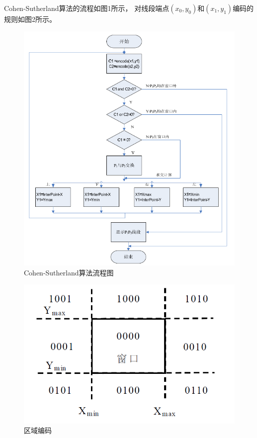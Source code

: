 \documentclass[a4paper,UTF8]{article}
\begin{document}
Cohen-Sutherland算法的流程如图1所示，
对线段端点$(x_0,y_0)$和$(x_1,y_1)$编码的规则如图2所示。
\begin{figure}[H]
    \centering
    \includegraphics[scale=0.8]{cohen-sutherland-flow.PNG}
    \caption{Cohen-Sutherland算法流程图}
\end{figure}
\begin{figure}[H]
    \centering
    \includegraphics[scale=0.6]{cohen-sutherland-encode.PNG}
    \caption{区域编码}
\end{figure}
\end{document}
